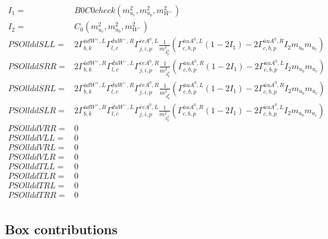\documentclass[A4,landscape]{article}
\begin{document}
\begin{align} 
I_1= & B0C0check(m^2_{u_{{c}}}, m^2_{u_{{b}}}, m^2_{W^-}) \\ 
I_2= & C_0(m^2_{u_{{c}}}, m^2_{u_{{b}}}, m^2_{W^-}) \\ 
  PSOllddSLL= & 2  \Gamma^{\bar{u}d W^+,L}_{b, k} \Gamma^{\bar{d}u W^- ,R}_{l, c} \Gamma^{\bar{e}e A^0 ,L}_{j, i, p} \frac{1}{m^2_{A^0_{{p}}}} (\Gamma^{\bar{u}u A^0 ,L}_{c, b, p} (1 - 2 I_1) - 2 \Gamma^{\bar{u}u A^0 ,R}_{c, b, p} I_2 m_{u_{{b}}} m_{u_{{c}}}) \\ 
  PSOllddSRR= & 2  \Gamma^{\bar{u}d W^+,R}_{b, k} \Gamma^{\bar{d}u W^- ,L}_{l, c} \Gamma^{\bar{e}e A^0 ,R}_{j, i, p} \frac{1}{m^2_{A^0_{{p}}}} (\Gamma^{\bar{u}u A^0 ,R}_{c, b, p} (1 - 2 I_1) - 2 \Gamma^{\bar{u}u A^0 ,L}_{c, b, p} I_2 m_{u_{{b}}} m_{u_{{c}}}) \\ 
  PSOllddSRL= & 2  \Gamma^{\bar{u}d W^+,L}_{b, k} \Gamma^{\bar{d}u W^- ,R}_{l, c} \Gamma^{\bar{e}e A^0 ,R}_{j, i, p} \frac{1}{m^2_{A^0_{{p}}}} (\Gamma^{\bar{u}u A^0 ,L}_{c, b, p} (1 - 2 I_1) - 2 \Gamma^{\bar{u}u A^0 ,R}_{c, b, p} I_2 m_{u_{{b}}} m_{u_{{c}}}) \\ 
  PSOllddSLR= & 2  \Gamma^{\bar{u}d W^+,R}_{b, k} \Gamma^{\bar{d}u W^- ,L}_{l, c} \Gamma^{\bar{e}e A^0 ,L}_{j, i, p} \frac{1}{m^2_{A^0_{{p}}}} (\Gamma^{\bar{u}u A^0 ,R}_{c, b, p} (1 - 2 I_1) - 2 \Gamma^{\bar{u}u A^0 ,L}_{c, b, p} I_2 m_{u_{{b}}} m_{u_{{c}}}) \\ 
  PSOllddVRR= & 0 \\ 
  PSOllddVLL= & 0 \\ 
  PSOllddVRL= & 0 \\ 
  PSOllddVLR= & 0 \\ 
  PSOllddTLL= & 0 \\ 
  PSOllddTLR= & 0 \\ 
  PSOllddTRL= & 0 \\ 
  PSOllddTRR= & 0 \\ 
\end{align} 
\subsection{Box contributions} 
\end{document}
